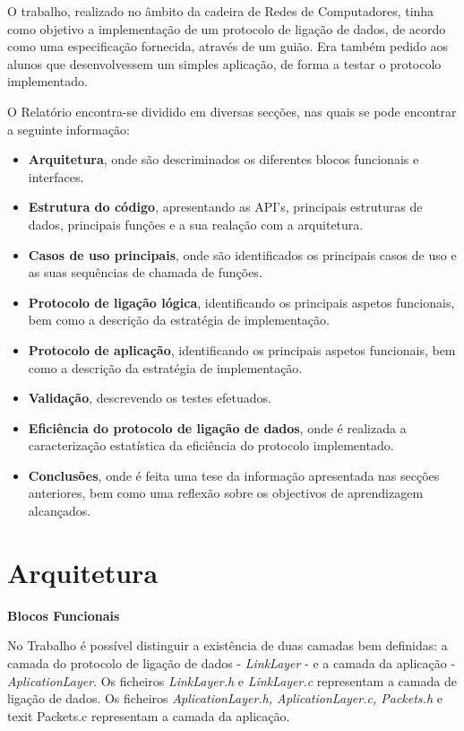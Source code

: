 \documentclass[a4paper, 11pt]{article}
\begin{document}
O trabalho, realizado no âmbito da cadeira de Redes de Computadores, tinha como objetivo a implementação de um protocolo de ligação de dados, de acordo como uma especificação fornecida, através de um guião. Era também pedido aos alunos que desenvolvessem um simples aplicação, de forma a testar o protocolo implementado.

O Relatório encontra-se dividido em diversas secções, nas quais se pode encontrar a seguinte informação:
\begin{itemize}
	\item \textbf{Arquitetura}, onde são descriminados os diferentes blocos funcionais e interfaces.
	\item \textbf{Estrutura do código}, apresentando as API's, principais estruturas de dados, principais funções e a sua realação com a arquitetura.
	\item \textbf{Casos de uso principais}, onde são identificados os principais casos de uso e as suas sequências de chamada de funções.
	\item \textbf{Protocolo de ligação lógica}, identificando os principais aspetos funcionais, bem como a descrição da estratégia de implementação.
	\item \textbf{Protocolo de aplicação},  identificando os principais aspetos funcionais, bem como a descrição da estratégia de implementação.
	\item \textbf{Validação}, descrevendo os testes efetuados.
	\item \textbf{Eficiência do protocolo de ligação de dados}, onde é realizada a caracterização estatística da eficiência do protocolo implementado.
	\item \textbf{Conclusões}, onde é feita uma tese da informação apresentada nas secções anteriores, bem como uma reflexão sobre os objectivos de aprendizagem alcançados.
\end{itemize}

\section{Arquitetura}

\large\textbf{Blocos Funcionais}\\
\normalsize 

No Trabalho é possível distinguir a existência de duas camadas bem definidas:  a camada do protocolo de ligação de dados - \textit{LinkLayer} - e a camada da aplicação - \textit{AplicationLayer}.
Os ficheiros \textit{LinkLayer.h} e  \textit{LinkLayer.c} representam a camada de ligação de dados. Os ficheiros \textit{AplicationLayer.h, AplicationLayer.c, Packets.h} e \\texit{ Packets.c} representam a camada da aplicação.
\end{document}
